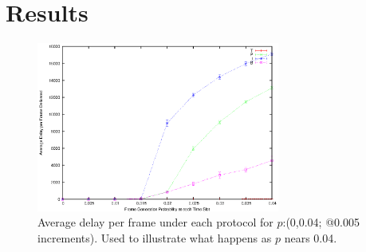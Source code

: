 \documentclass[twocolumn]{article}
\begin{document}




\section*{Results}

\begin{figure}
    \centering \includegraphics[width=8cm]{plots/delay_big.eps}
    \caption{\footnotesize  Average delay per frame under each protocol for
    $p$:(0,0.04; @0.005 increments). Used to illustrate what happens as $p$
    nears 0.04.} \label{fig:delay_big}
\end{figure}
\end{document}
